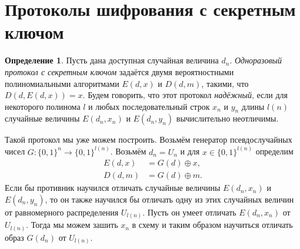 \documentclass[12pt,a4paper]{article}
\newcommand{\bits}{\{0,1\}}
\theoremstyle{definition}
\newtheorem{definition}{Определение}[section]
\theoremstyle{plain}
\theoremstyle{remark}
\begin{document}
\section{Протоколы шифрования с секретным ключом}
\begin{definition}
Пусть дана доступная случайная величина $d_n$. \emph{Одноразовый протокол с секретным ключом} задаётся двумя вероятностными полиномиальными алгоритмами
$E(d,x)$ и $D(d, m)$, такими, что $D(d, E(d, x)) = x$.
Будем говорить, что этот протокол \emph{надёжный}, если для некоторого полинома $l$ и любых последовательный строк $x_n$ и $y_n$ длины $l(n)$ случайные величины $E(d_n, x_n)$ и $E(d_n, y_n)$ вычислительно неотличимы.
\end{definition}

Такой протокол мы уже можем построить. Возьмём генератор псевдослучайных чисел $G: \bits^n\to\bits^{l(n)}$.
Возьмём $d_n = U_n$ и для $x\in\bits^{l(n)}$ определим 
$$
\begin{aligned}
E(d, x) &= G(d) \oplus x,\\ D(d, m) &= G(d) \oplus m.
\end{aligned}
$$
Если бы противник научился отличать случайные величины $E(d_n, x_n)$ и $E(d_n, y_n)$, то 
он также научился бы отличать одну из этих случайных величин от равномерного распределения
$U_{l(n)}$. Пусть он умеет отличать $E(d_n, x_n)$ от $U_{l(n)}$. Тогда мы можем зашить $x_n$ в схему 
и таким образом научиться отличать образ $G(d_n)$ от $U_{l(n)}$.
\end{document}
